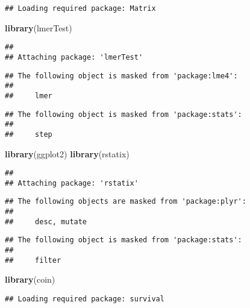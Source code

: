 \documentclass[
]{article}
\newenvironment{Shaded}{\begin{snugshade}}{\end{snugshade}}
\newcommand{\KeywordTok}[1]{\textcolor[rgb]{0.13,0.29,0.53}{\textbf{#1}}}
\newcommand{\NormalTok}[1]{#1}
\begin{document}
\begin{verbatim}
## Loading required package: Matrix
\end{verbatim}

\begin{Shaded}
\begin{Highlighting}[]
\KeywordTok{library}\NormalTok{(lmerTest)}
\end{Highlighting}
\end{Shaded}

\begin{verbatim}
## 
## Attaching package: 'lmerTest'
\end{verbatim}

\begin{verbatim}
## The following object is masked from 'package:lme4':
## 
##     lmer
\end{verbatim}

\begin{verbatim}
## The following object is masked from 'package:stats':
## 
##     step
\end{verbatim}

\begin{Shaded}
\begin{Highlighting}[]
\KeywordTok{library}\NormalTok{(ggplot2)}
\KeywordTok{library}\NormalTok{(rstatix)}
\end{Highlighting}
\end{Shaded}

\begin{verbatim}
## 
## Attaching package: 'rstatix'
\end{verbatim}

\begin{verbatim}
## The following objects are masked from 'package:plyr':
## 
##     desc, mutate
\end{verbatim}

\begin{verbatim}
## The following object is masked from 'package:stats':
## 
##     filter
\end{verbatim}

\begin{Shaded}
\begin{Highlighting}[]
\KeywordTok{library}\NormalTok{(coin)}
\end{Highlighting}
\end{Shaded}

\begin{verbatim}
## Loading required package: survival
\end{verbatim}
\end{document}
